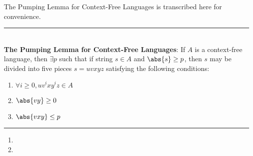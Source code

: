 The Pumping Lemma for Context-Free Languages is transcribed here for convenience.
\rule{\textwidth}{1pt}\\[1em]
\textbf{The Pumping Lemma for Context-Free Languages}: If $A$ is a context-free language, then $\exists p$ such that if string $s \in A$ and $\abs{s} \geq p$, then $s$ may be divided into five pieces $s = uvxyz$ satisfying the following conditions:
\begin{enumerate}[label=\arabic*.]
	\item $\forall i \geq 0, uv^ixy^iz \in A$
	\item $\abs{vy} \geq 0$
	\item $\abs{vxy} \leq p$
\end{enumerate}
\rule{\textwidth}{1pt}

\begin{enumerate}
	\item 
	\addtocounter{enumi}{2}
	\item 
\end{enumerate}